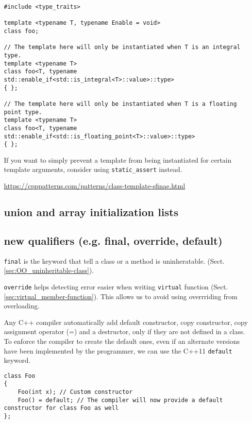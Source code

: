 \begin{verbatim}
#include <type_traits>

template <typename T, typename Enable = void>
class foo;

// The template here will only be instantiated when T is an integral type.
template <typename T>
class foo<T, typename std::enable_if<std::is_integral<T>::value>::type>
{ };

// The template here will only be instantiated when T is a floating point type.
template <typename T>
class foo<T, typename std::enable_if<std::is_floating_point<T>::value>::type>
{ };

\end{verbatim}

If you want to simply prevent a template from being instantiated for certain template arguments, consider using 
\verb!static_assert! instead.

\url{https://cpppatterns.com/patterns/class-template-sfinae.html}

\subsection{union and array initialization lists}


\subsection{new qualifiers (e.g. final, override, default)}
\label{sec:C++11_final-override-default-delete}
\label{sec:C++11-delete}

\verb!final! is the keyword that tell a class or a method is uninheratable.
(Sect.\ref{sec:OO_uninheritable-class}).

\verb!override! helps detecting error easier when writing \verb!virtual!
function (Sect.\ref{sec:virtual_member-function}). This allows us to avoid using
overrriding from overloading.

Any C++ compiler automatically add default constructor, copy constructor, copy
assignment operator (=) and a destructor, only if they are not defined in a
class. To enforce the compiler to create the default ones, even if an alternate
versions have been implemented by the programmer, we can use the C++11
\verb!default! keyword.

\begin{Verbatim}
class Foo
{
    Foo(int x); // Custom constructor
    Foo() = default; // The compiler will now provide a default constructor for class Foo as well
};
\end{Verbatim}

